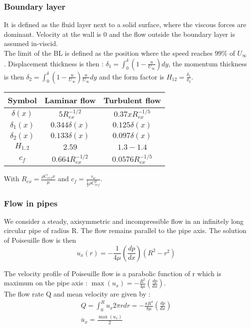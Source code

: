 \documentclass[../main.tex]{subfiles}
\begin{document}
\subsubsection{Boundary layer}
It is defined as the fluid layer next to a solid surface, where the viscous forces are dominant. Velocity at the wall is 0 and the flow outside the boundary layer is assumed in-viscid.\\
The limit of the BL is defined as the position where the speed reaches $99\%$ of $U_\infty$. Displacement thickness is then : $\delta_1 = \int_0^\delta (1-\frac{u}{U_\infty})dy$, the momentum thickness is then $\delta_2 = \int_0^\delta (1-\frac{u}{U_\infty})\frac{u}{U_\infty}dy$ and the form factor is $H_{12} = \frac{\delta_1}{\delta_2}$.\\

\begin{table}[hbt!]
    \centering
    \begin{tabular}{||c|c|c|}
    \hline
        Symbol & Laminar flow & Turbulent flow \\ \hline
        $\delta (x)$ & $5 R_{ex}^{-1/2}$ & $0.37 x R_{ex}^{-1/5}$\\ \hline
        $\delta_1(x)$ & $0.344 \delta(x) $ & $0.125 \delta(x)$ \\ \hline
        $\delta_2(x)$ & $0.133 \delta(x) $ & $0.097 \delta(x)$\\ \hline
        $H_{1,2} $ & $2.59$ & $1.3-1.4$\\ \hline
        $c_f$ & $0.664 R_{ex}^{-1/2}$ & $0.0576 R_{ex}^{-1/5}$\\ \hline
    \end{tabular}
\end{table}
With $R_{ex} = \frac{\rho C_{ref} x}{\mu}$ and $c_f = \frac{\tau_w}{\frac{1}{2}\rho C_{ref}^2}$.\\

\subsubsection{Flow in pipes}
We consider a steady, axisymmetric and incompressible flow in an infinitely long circular pipe of radius R. The flow remains parallel to the pipe axis. The solution of Poiseuille flow is then \begin{equation}
u_x(r) = -\frac{1}{4\mu} (\frac{dp}{dx}) (R^2-r^2) \end{equation}

The velocity profile of Poiseuille flow is a parabolic function of r which is maximum on the pipe axis : $\max(u_x) = -\frac{R^2}{4\mu} (\frac{dp}{dx})$.\\
The flow rate Q and mean velocity are given by : \begin{equation}
    \begin{gathered}
        Q = \int_0^R u_x 2\pi r dr = -\frac{\pi R^4}{8\mu} (\frac{dp}{dx})\\
        \overline{u}_x = \frac{\max(u_x)}{2}\\
    \end{gathered}
\end{equation}
\end{document}
